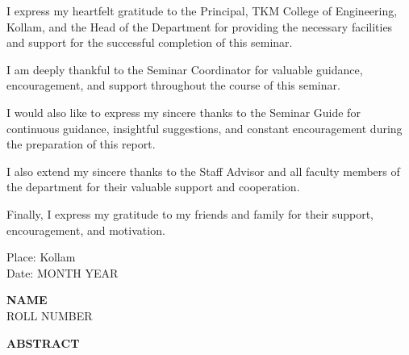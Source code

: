 \documentclass[12pt]{article}
\newcommand{\studentname}{NAME}
\newcommand{\rollnumber}{ROLL NUMBER}
\newcommand{\reportmonth}{MONTH YEAR}
\begin{document}
\par\vspace{0.3cm}

I express my heartfelt gratitude to the Principal, TKM College of Engineering, Kollam, and the Head of the Department for providing the necessary facilities and support for the successful completion of this seminar.

\par\vspace{0.3cm}

I am deeply thankful to the Seminar Coordinator for valuable guidance, encouragement, and support throughout the course of this seminar.

\par\vspace{0.3cm}

I would also like to express my sincere thanks to the Seminar Guide for continuous guidance, insightful suggestions, and constant encouragement during the preparation of this report.

\par\vspace{0.3cm}

I also extend my sincere thanks to the Staff Advisor and all faculty members of the department for their valuable support and cooperation.

\par\vspace{0.3cm}

Finally, I express my gratitude to my friends and family for their support, encouragement, and motivation.

\vspace{0.8cm}

\noindent
\begin{minipage}[t]{0.5\textwidth}
Place: Kollam\\
Date: \reportmonth
\end{minipage}
\hfill
\begin{minipage}[t]{0.4\textwidth}
\begin{flushright}
\textbf{\studentname}\\
\rollnumber
\end{flushright}
\end{minipage}

\newpage

\begin{center}
\textbf{\Large ABSTRACT}
\end{center}
\end{document}
